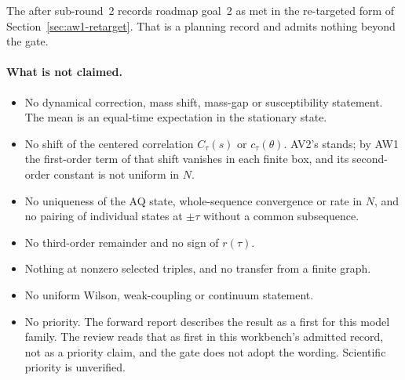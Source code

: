 The  after
sub-round~2 records roadmap goal~2 as met in the re-targeted form of
Section~\ref{sec:aw1-retarget}. That is a planning record and admits nothing
beyond the gate.

\paragraph{What is not claimed.}
\begin{itemize}
\item No dynamical correction, mass shift, mass-gap or susceptibility
statement. The mean is an equal-time expectation in the stationary state.
\item No shift of the centered correlation $C_\tau(s)$ or $c_\tau(\theta)$.
AV2's  stands; by AW1 the first-order term of that
shift vanishes in each finite box, and its second-order constant is not
uniform in $N$.
\item No uniqueness of the AQ state, whole-sequence convergence or rate in
$N$, and no pairing of individual states at $\pm\tau$ without a common
subsequence.
\item No third-order remainder and no sign of $r(\tau)$.
\item Nothing at nonzero selected triples, and no transfer from a finite graph.
\item No uniform Wilson, weak-coupling or continuum statement.
\item No priority. The forward report describes the result as a first for this
model family. The review reads that as first in this workbench's admitted
record, not as a priority claim, and the gate does not adopt the wording.
Scientific priority is unverified.
\end{itemize}

